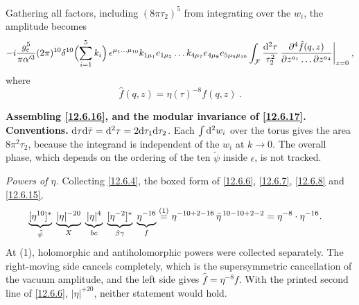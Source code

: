 \noindent Gathering all factors, including $(8\pi\tau_2)^5$ from integrating over the $w_i$, the amplitude becomes
\begin{equation}
	-i\frac{g_{\mathrm{c}}^5}{\pi\alpha'^3}(2\pi)^{10}\delta^{10}\Bigl(\sum_{i=1}^{5}k_i\Bigr)\,\epsilon^{\mu_1\dots\mu_{10}}k_{1\mu_1}e_{1\mu_2}\dots k_{4\mu_7}e_{4\mu_8}e_{5\mu_9\mu_{10}}\int_{\mathcal{F}}\frac{\mathrm{d}^2\tau}{\tau_2^2}\,\frac{\partial^4 \hat{f}(q,z)}{\partial z^{a_1}\dots\partial z^{a_4}}\bigg|_{z=0} \:, \label{12.6.16}
\end{equation}
where
\begin{equation}
	\hat{f}(q,z) = \eta(\tau)^{-8}f(q,z) \:. \label{12.6.17}
\end{equation}
\begin{tcolorbox}[breakable]
	\begin{remark}
		\textbf{Assembling \eqref{12.6.16}, and the modular invariance of \eqref{12.6.17}.} \textbf{Conventions.} $\mathrm{d}\tau\mathrm{d}\bar\tau=\mathrm{d}^{2}\tau=2\mathrm{d}\tau_{1}\mathrm{d}\tau_{2}$. Each $\int\mathrm{d}^{2}w_{i}$ over the torus gives the area $8\pi^{2}\tau_{2}$, because the integrand is independent of the $w_{i}$ at $k\to0$. The overall phase, which depends on the ordering of the ten $\tilde\psi$ inside $\epsilon$, is not tracked.

		\emph{Powers of $\eta$.} Collecting \eqref{12.6.4}, the boxed form of \eqref{12.6.6}, \eqref{12.6.7}, \eqref{12.6.8} and \eqref{12.6.15},
		\begin{align*}
			\underbrace{[\eta^{10}]^{*}}_{\tilde\psi}\;\underbrace{|\eta|^{-20}}_{X}\;\underbrace{|\eta|^{4}}_{bc}\;\underbrace{[\eta^{-2}]^{*}}_{\beta\gamma}\;\underbrace{\eta^{-16}}_{f}
			&\overset{(1)}{=} \eta^{-10+2-16}\,\bar\eta^{\,10-10+2-2}=\eta^{-8}\cdot\eta^{-16} .
		\end{align*}
		At (1), holomorphic and antiholomorphic powers were collected separately. The right-moving side cancels completely, which is the supersymmetric cancellation of the vacuum amplitude, and the left side gives $\hat f=\eta^{-8}f$. With the printed second line of \eqref{12.6.6}, $|\eta|^{+20}$, neither statement would hold.


\end{remark}
\end{tcolorbox}
